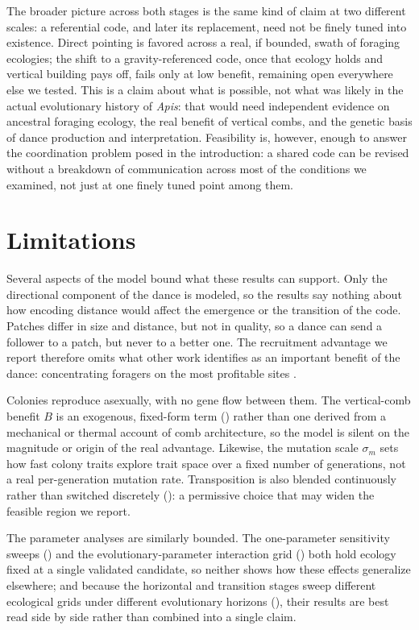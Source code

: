 \documentclass[11pt]{article}
\begin{document}
The broader picture across both stages is the same kind of claim at two
different scales: a referential code, and later its replacement, need not be
finely tuned into existence. Direct pointing is favored across a real, if
bounded, swath of foraging ecologies; the shift to a gravity-referenced code,
once that ecology holds and vertical building pays off, fails only at low
benefit, remaining open everywhere else we tested. This is a claim about what is
possible, not what was likely in the actual evolutionary history of \emph{Apis}:
that would need independent evidence on ancestral foraging ecology, the real
benefit of vertical combs, and the genetic basis of dance production and
interpretation. Feasibility is, however, enough to answer the coordination
problem posed in the introduction: a shared code can be revised without a
breakdown of communication across most of the conditions we examined, not just
at one finely tuned point among them.

\section{Limitations}
\label{sec:limitations}

Several aspects of the model bound what these results can support. Only the
directional component of the dance is modeled, so the results say nothing about how
encoding distance would affect the emergence or the transition of the code.
Patches differ in size and distance, but not in quality, so a dance can send
a follower to a patch, but never to a better one. The recruitment advantage we
report therefore omits what other work identifies as an important benefit of the
dance: concentrating foragers on the most profitable sites
\citep{beekman2008pay,donaldsonmatasci2012habitat}.

Colonies reproduce asexually, with no gene flow between them. The
vertical-comb benefit $B$ is an exogenous, fixed-form term
() rather than one derived from a mechanical or thermal
account of comb architecture, so the model is silent on the magnitude or
origin of the real advantage. Likewise, the mutation scale $\sigma_m$ sets how fast
colony traits explore trait space over a fixed number of generations, not a
real per-generation mutation rate. Transposition is also blended continuously rather than
switched discretely (): a permissive choice that may widen
the feasible region we report.

The parameter analyses are similarly bounded. The one-parameter sensitivity
sweeps () and the
evolutionary-parameter interaction grid () both hold
ecology fixed at a single validated candidate, so neither shows how these
effects generalize elsewhere; and because the horizontal and transition stages
sweep different ecological grids under different evolutionary horizons
(), their results are best read
side by side rather than combined into a single claim.



\end{document}
